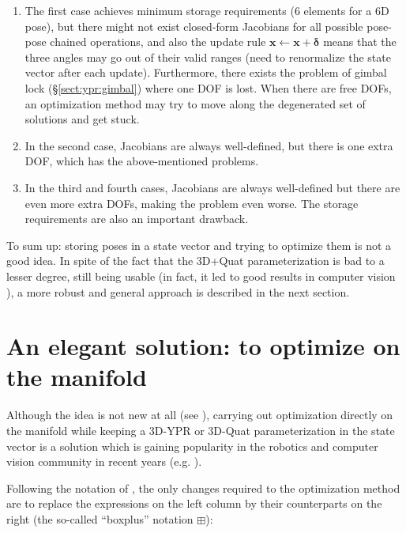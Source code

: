 \documentclass[a4paper,11pt]{report}
\newcommand{\DEL}{{\bm{\delta}}}
\begin{document}
\begin{enumerate}
 \item The first case achieves minimum storage requirements (6 elements for a 6D pose),
but there might not exist closed-form Jacobians for all possible pose-pose chained operations,
and also the update rule $\mathbf{x}  \leftarrow \mathbf{x} + \DEL$ means that the three
angles may go out of their valid ranges (need to renormalize the state vector after each update).
Furthermore, there exists the problem of gimbal lock (\S \ref{sect:ypr:gimbal}) where one
DOF is lost. When there are free DOFs, an optimization method may try to move along the
degenerated set of solutions and get stuck.

\item In the second case, Jacobians are always well-defined, but there is one extra DOF, which has
the above-mentioned problems.

\item In the third and fourth cases, Jacobians are always well-defined but there are
even more extra DOFs, making the problem even worse. The storage requirements are also an
important drawback.
\end{enumerate}

To sum up: storing poses in a state vector and trying to optimize
them is not a good idea.
In spite of the fact that
the 3D+Quat parameterization is bad to a lesser degree,
still being usable
(in fact, it led to good results in computer vision \cite{davison2007mrt}),
a more robust and general approach is described in the next section.


\section{An elegant solution: to optimize on the manifold}
\label{sect:opti_manif}

Although the idea is not new at all (see \cite{gabay1982mdf}),
carrying out optimization directly on the manifold while
keeping a 3D-YPR or 3D-Quat parameterization in the
state vector is a solution which is gaining popularity
in the robotics and computer vision community in recent years
(e.g. \cite{hertzberg2008fsm,strasdat2010scale}).

Following the notation of \cite{hertzberg2008fsm,hertzberg2013integrating}, the only changes required
to the optimization method are
to replace the expressions on the left column by their counterparts on the right (the so-called ``boxplus'' notation $\boxplus$):
\end{document}
